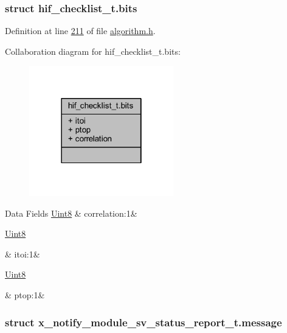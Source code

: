 \subsubsection{struct hif\+\_\+checklist\+\_\+t.\+bits}


Definition at line \hyperlink{a00021_source_l00211}{211} of file \hyperlink{a00021_source}{algorithm.\+h}.



Collaboration diagram for hif\+\_\+checklist\+\_\+t.\+bits\+:\nopagebreak
\begin{figure}[H]
\begin{center}
\leavevmode
\includegraphics[width=178pt]{dd/d08/a00884}
\end{center}
\end{figure}
\begin{DoxyFields}{Data Fields}
\hypertarget{a00021_a3ad312362de2d7af9d21f6211605a64f}{\hyperlink{a00072_af84840501dec18061d18a68c162a8fa2}{Uint8}}\label{a00021_a3ad312362de2d7af9d21f6211605a64f}
&
correlation\+:1&
\\
\hline

\hypertarget{a00021_a37f2509fe0e8b94b779ef8bf17b6261f}{\hyperlink{a00072_af84840501dec18061d18a68c162a8fa2}{Uint8}}\label{a00021_a37f2509fe0e8b94b779ef8bf17b6261f}
&
itoi\+:1&
\\
\hline

\hypertarget{a00021_a55d1fb9c02c2a9bf8a7b2361c79f6552}{\hyperlink{a00072_af84840501dec18061d18a68c162a8fa2}{Uint8}}\label{a00021_a55d1fb9c02c2a9bf8a7b2361c79f6552}
&
ptop\+:1&
\\
\hline

\end{DoxyFields}
\label{dd/d7b/a00865}
\hypertarget{a00021_dd/d7b/a00865}{}
\subsubsection{struct x\+\_\+notify\+\_\+module\+\_\+sv\+\_\+status\+\_\+report\+\_\+t.\+message}


